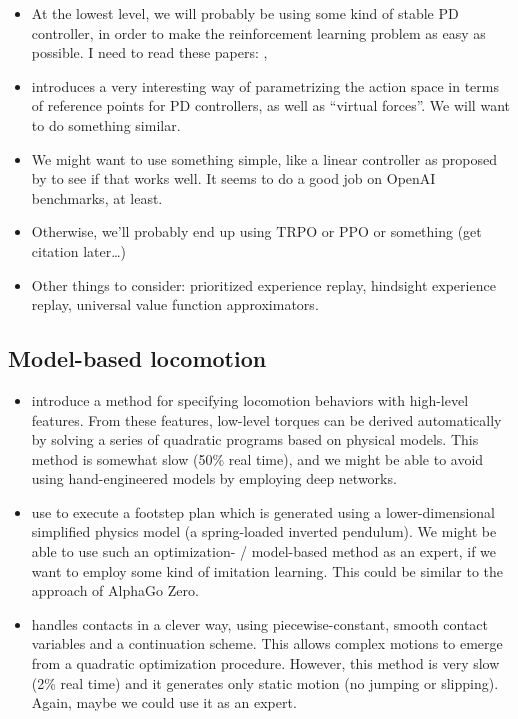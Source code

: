 \documentclass[a4paper]{article}
\newcommand{\highlight}[1]{{\leavevmode\color{blue} #1}}
\begin{document}
\begin{itemize}
  \item At the lowest level, we will probably be using some kind of stable PD controller, in order to make the reinforcement learning problem as easy as possible. \highlight{I need to read these papers:} \cite{tan2011stable}, \cite{shrivastava2013stable}
  \item \cite{peng2015terrain} introduces a very interesting way of parametrizing the action space in terms of reference points for PD controllers, as well as ``virtual forces''. We will want to do something similar.
  \item We might want to use something simple, like a linear controller as proposed by \cite{mania2018simple} to see if that works well.
    It seems to do a good job on OpenAI benchmarks, at least.
  \item Otherwise, we'll probably end up using TRPO or PPO or something (get citation later\dots)
  \item Other things to consider: prioritized experience replay, hindsight experience replay, universal value function approximators.
\end{itemize}


\subsection*{Model-based locomotion}

\begin{itemize}
  \item \cite{de2010feature} introduce a method for specifying locomotion behaviors with high-level features. From these features, low-level torques can be derived automatically by solving a series of quadratic programs based on physical models. This method is somewhat slow (50\% real time), and we might be able to avoid using hand-engineered models by employing deep networks.

  \item \cite{mordatch2010robust} use \cite{de2010feature} to execute a footstep plan which is generated using a lower-dimensional simplified physics model (a spring-loaded inverted pendulum). We might be able to use such an optimization- / model-based method as an expert, if we want to employ some kind of imitation learning. This could be similar to the approach of AlphaGo Zero.

  \item \cite{mordatch2012discovery} handles contacts in a clever way, using piecewise-constant, smooth contact variables and a continuation scheme. This allows complex motions to emerge from a quadratic optimization procedure. However, this method is very slow (2\% real time) and it generates only static motion (no jumping or slipping). Again, maybe we could use it as an expert.

\end{itemize}
\end{document}
